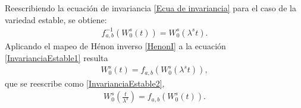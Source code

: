 Reescribiendo la ecuación de invariancia \eqref{Ecua de invariancia} para el caso de la variedad estable, se obtiene:
\begin{eqnarray}
f_{a,b}^{-1}(W_{0}^{s}(t))=W_{0}^{s}(\lambda^{s}t).
\label{InvarianciaEstable1}
\end{eqnarray}
Aplicando el mapeo de Hénon inverso \eqref{HenonI} a la ecuación \eqref{InvarianciaEstable1} resulta
\begin{eqnarray}
W_{0}^{s}(t)=f_{a,b}(W_{0}^{s}(\lambda^{s}t)),
\label{InvarianciaEstable2}
\end{eqnarray}
que se reescribe como \eqref{InvarianciaEstable2}, 
\begin{eqnarray}
W_{0}^{s}\left(\frac{t}{\lambda^{s}}\right)=f_{a,b}(W_{0}^{s}(t)).
\label{InvarianciaEstable3}
\end{eqnarray}

